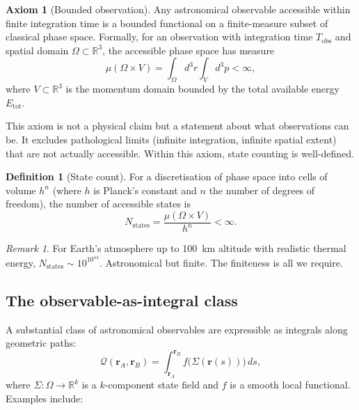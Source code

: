 \documentclass[11pt,twocolumn,a4paper]{article}
\theoremstyle{definition}
\newtheorem{definition}[theorem]{Definition}
\newtheorem{axiom}{Axiom}
\theoremstyle{remark}
\newtheorem{remark}[theorem]{Remark}
\newcommand{\Rvec}{\mathbf{r}}
\newcommand{\Qobs}{\mathcal{Q}}
\newcommand{\Sigmaf}{\Sigma}
\begin{document}
\begin{axiom}[Bounded observation]\label{ax:bounded}
Any astronomical observable accessible within finite integration time is a bounded functional on a finite-measure subset of classical phase space. Formally, for an observation with integration time $T_{\text{obs}}$ and spatial domain $\Omega \subset \mathbb{R}^3$, the accessible phase space has measure
\begin{equation}
\mu(\Omega \times V) = \int_\Omega d^3r \int_V d^3p < \infty,
\end{equation}
where $V \subset \mathbb{R}^3$ is the momentum domain bounded by the total available energy $E_\text{tot}$.
\end{axiom}

This axiom is not a physical claim but a statement about what observations can be. It excludes pathological limits (infinite integration, infinite spatial extent) that are not actually accessible. Within this axiom, state counting is well-defined.

\begin{definition}[State count]\label{def:count}
For a discretisation of phase space into cells of volume $h^n$ (where $h$ is Planck's constant and $n$ the number of degrees of freedom), the number of accessible states is
\begin{equation}
N_\text{states} = \frac{\mu(\Omega \times V)}{h^n} < \infty.
\end{equation}
\end{definition}

\begin{remark}
For Earth's atmosphere up to 100~km altitude with realistic thermal energy, $N_\text{states} \sim 10^{10^{44}}$. Astronomical but finite. The finiteness is all we require.
\end{remark}

\subsection{The observable-as-integral class}

A substantial class of astronomical observables are expressible as integrals along geometric paths:
\begin{equation}
\label{eq:observable}
\Qobs(\Rvec_A, \Rvec_B) = \int_{\Rvec_A}^{\Rvec_B} f\big(\Sigmaf(\Rvec(s))\big)\,ds,
\end{equation}
where $\Sigmaf : \Omega \to \mathbb{R}^k$ is a $k$-component state field and $f$ is a smooth local functional. Examples include:
\end{document}
